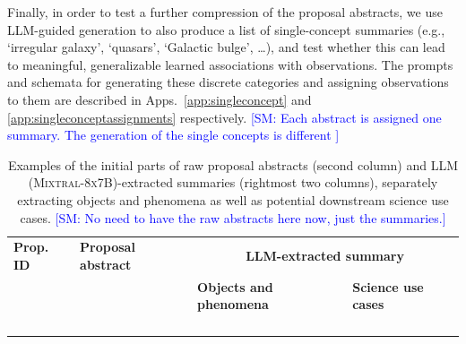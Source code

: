 \documentclass[10pt]{article} %
\newcommand{\SM}[1]{\textcolor{blue}{[SM: #1]}}
\begin{document}
Finally, in order to test a further compression of the proposal abstracts, we use LLM-guided generation to also produce a list of single-concept summaries (e.g., `irregular galaxy', `quasars', `Galactic bulge', \ldots), and test whether this can lead to meaningful, generalizable learned associations with observations.
%
The prompts and schemata for generating these discrete categories and assigning observations to them are described in Apps.~\ref{app:singleconcept} and \ref{app:singleconceptassignments} respectively. \SM{Each abstract is assigned one summary. The generation of the single concepts is different }


\begin{landscape}
      \begin{table}[h!]
          \centering
          \begin{tabular}{m{1.8cm} m{8cm} m{5cm} m{6cm}}
              \toprule
              \bfseries Prop. ID & \centering\arraybackslash \bfseries Proposal abstract & \multicolumn{2}{c}{\bfseries LLM-extracted summary} \tabularnewline
              \cmidrule(r){3-4}
              & & \centering\arraybackslash \bfseries Objects and phenomena & \centering\arraybackslash \bfseries Science use cases \tabularnewline
              \midrule
               & {\scriptsize } & {\scriptsize } & {\scriptsize } \tabularnewline
              \midrule
               & {\scriptsize } & {\scriptsize } & {\scriptsize } \tabularnewline
              \midrule
               & {\scriptsize } & {\scriptsize } & {\scriptsize } \tabularnewline
              \midrule
               & {\scriptsize } & {\scriptsize } & {\scriptsize } \tabularnewline
              \bottomrule
          \end{tabular}
          \caption{Examples of the initial parts of raw proposal abstracts (second column) and LLM (\textsc{Mixtral-8x7B})-extracted summaries (rightmost two columns), separately extracting objects and phenomena as well as potential downstream science use cases. \SM{No need to have the raw abstracts here now, just the summaries.}}
          \label{tab:datasetsumm}
      \end{table}
  \end{landscape}
\end{document}
